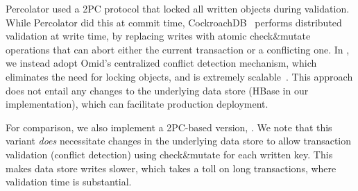 

Percolator 
used a 2PC protocol that locked all written objects during validation.
While Percolator did this at commit time, CockroachDB~\cite{cockroach} performs distributed validation at write time, 
by replacing writes with atomic check\&mutate operations that can abort either the current transaction or a conflicting one. 
In \sysll, we instead adopt Omid's centralized conflict detection mechanism, which eliminates the need for locking objects,
and is extremely scalable~\cite{Omid2017}. This approach does not entail any changes to the underlying data store (HBase in our implementation),
which can facilitate production deployment.

For comparison, we also implement a 2PC-based version, \syspc.  We note that this variant \emph{does} necessitate changes in the 
underlying data store to allow transaction validation (conflict detection) using check\&mutate for each written key. This makes data store writes slower,
which takes a toll on long transactions, where validation time is substantial.


